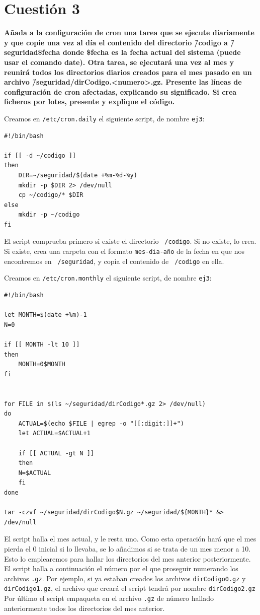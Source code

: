 \documentclass[a4paper,10pt]{article}
\newenvironment{answer}{%
\begin{list}{}{%
}%
\item[]}{\end{list}}
\begin{document}
\section{Cuestión 3}
\textbf{ Añada a la configuración de cron una tarea que se ejecute diariamente y que copie una vez al día el contenido del directorio
\~/codigo a \~/seguridad\$fecha donde \$fecha es la fecha actual del sistema (puede usar el comando
date). Otra tarea, se ejecutará una vez al mes y reunirá todos los directorios diarios creados para el mes pasado
en un archivo \~/seguridad/dirCodigo.<numero>.gz. Presente las líneas de configuración de cron afectadas, explicando
su significado. Si crea ficheros por lotes, presente y explique el código.}
\begin{answer}
 Creamos en \texttt{/etc/cron.daily} el siguiente script, de nombre \texttt{ej3}:
 
\begin{lstlisting}[style=BashInputStyle]
#!/bin/bash

if [[ -d ~/codigo ]]
then
    DIR=~/seguridad/$(date +%m-%d-%y)
    mkdir -p $DIR 2> /dev/null
    cp ~/codigo/* $DIR 
else
    mkdir -p ~/codigo
fi
\end{lstlisting}
  
  El script comprueba primero si existe el directorio \texttt{~/codigo}. Si no existe, lo crea. Si existe, crea una carpeta
  con el formato \texttt{mes-dia-año} de la fecha en que nos encontremos en \texttt{~/seguridad}, y copia el contenido de \texttt{~/codigo}
  en ella.
  
  Creamos en \texttt{/etc/cron.monthly} el siguiente script, de nombre \texttt{ej3}:
  
\begin{lstlisting}[style=BashInputStyle]
#!/bin/bash

let MONTH=$(date +%m)-1
N=0

if [[ MONTH -lt 10 ]]
then
    MONTH=0$MONTH
fi


for FILE in $(ls ~/seguridad/dirCodigo*.gz 2> /dev/null)
do
    ACTUAL=$(echo $FILE | egrep -o "[[:digit:]]+")
    let ACTUAL=$ACTUAL+1
    
    if [[ ACTUAL -gt N ]]
    then
	N=$ACTUAL
    fi
done

tar -czvf ~/seguridad/dirCodigo$N.gz ~/seguridad/${MONTH}* &> /dev/null
\end{lstlisting}
  
  El script halla el mes actual, y le resta uno. Como esta operación hará que el mes pierda el 0 inicial si lo llevaba, se lo añadimos
  si se trata de un mes menor a 10. Esto lo emplearemos para hallar los directorios del mes anterior posteriormente.
  El script halla a continuación el número por el que proseguir numerando los archivos \texttt{.gz}. Por ejemplo, si ya estaban
  creados los archivos \texttt{dirCodigo0.gz} y \texttt{dirCodigo1.gz}, el archivo que creará el script tendrá por nombre \texttt{dirCodigo2.gz}
  Por último el script empaqueta en el archivo \texttt{.gz} de número hallado anteriormente todos los directorios del mes anterior.
\end{answer}
\end{document}

